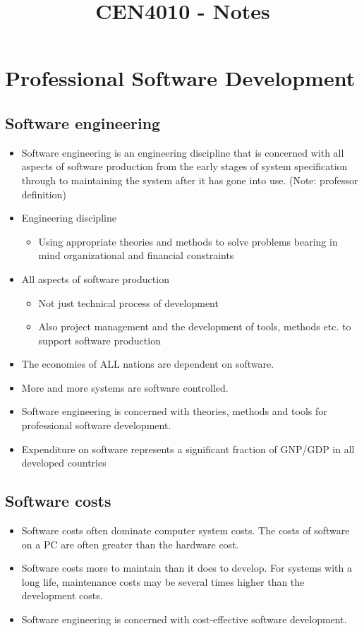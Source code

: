 \documentclass{report}
\title{\textbf{CEN4010 - Notes}}
\author{}
\date{}
\begin{document}
\maketitle
\tableofcontents
\newpage

\chapter{Professional Software Development}
\section{Software engineering}
\begin{itemize}
  \item Software engineering is an engineering discipline that is concerned with all aspects of software production from the early stages of system specification through to maintaining the system after it has gone into use. (Note: professor definition)
  \item Engineering discipline
  \begin{itemize}
    \item Using appropriate theories and methods to solve problems bearing in mind
organizational and financial constraints
\end{itemize}
  \item All aspects of software production
  \begin{itemize}
    \item Not just technical process of development
    \item Also project management and the development of tools, methods etc. to support software production
  \end{itemize}
  \item The economies of ALL nations are dependent on software.
  \item More and more systems are software controlled.
  \item Software engineering is concerned with theories, methods and tools for professional software development.
  \item Expenditure on software represents a significant fraction of GNP/GDP in all developed countries
\end{itemize}

\section{Software costs}
\begin{itemize}
  \item Software costs often dominate computer system costs. The costs of software on a PC are often greater than the hardware cost.
  \item Software costs more to maintain than it does to develop. For systems with a long life, maintenance costs may be several times higher than the development costs.
  \item Software engineering is concerned with cost-effective software development.
\end{itemize}
\end{document}
